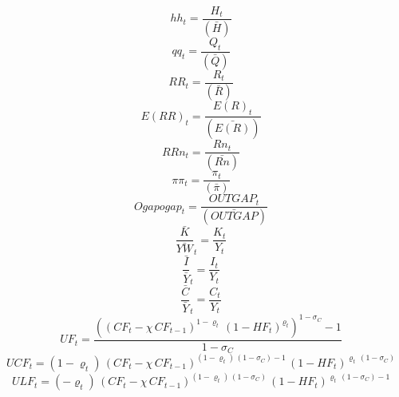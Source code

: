 \begin{dmath}
{hh}_{t}=\frac{{H}_{t}}{(\bar{H})}
\end{dmath}
\begin{dmath}
{qq}_{t}=\frac{{Q}_{t}}{(\bar{Q})}
\end{dmath}
\begin{dmath}
{RR}_{t}=\frac{{R}_{t}}{(\bar{R})}
\end{dmath}
\begin{dmath}
{E(RR)}_{t}=\frac{{E(R)}_{t}}{(\bar{E(R)})}
\end{dmath}
\begin{dmath}
{RRn}_{t}=\frac{{Rn}_{t}}{(\bar{Rn})}
\end{dmath}
\begin{dmath}
{\pi\pi}_{t}=\frac{{\pi}_{t}}{(\bar{\pi})}
\end{dmath}
\begin{dmath}
{Ogapogap}_{t}=\frac{{OUTGAP}_{t}}{(\bar{OUTGAP})}
\end{dmath}
\begin{dmath}
{\frac{\bar{K}}{\bar{YW}}}_{t}=\frac{{K}_{t}}{{Y}_{t}}
\end{dmath}
\begin{dmath}
{\frac{\bar{I}}{\bar{Y}}}_{t}=\frac{{I}_{t}}{{Y}_{t}}
\end{dmath}
\begin{dmath}
{\frac{\bar{C}}{\bar{Y}}}_{t}=\frac{{C}_{t}}{{Y}_{t}}
\end{dmath}
\begin{dmath}
{UF}_{t}=\frac{\left(\left({CF}_{t}-{{\chi}}\, {CF}_{t-1}\right)^{1-{{\varrho}}_{t}}\, \left(1-{HF}_{t}\right)^{{{\varrho}}_{t}}\right)^{1-{{\sigma_{C}}}}-1}{1-{{\sigma_{C}}}}
\end{dmath}
\begin{dmath}
{UCF}_{t}=\left(1-{{\varrho}}_{t}\right)\, \left({CF}_{t}-{{\chi}}\, {CF}_{t-1}\right)^{\left(1-{{\varrho}}_{t}\right)\, \left(1-{{\sigma_{C}}}\right)-1}\, \left(1-{HF}_{t}\right)^{{{\varrho}}_{t}\, \left(1-{{\sigma_{C}}}\right)}
\end{dmath}
\begin{dmath}
{ULF}_{t}=\left(-{{\varrho}}_{t}\right)\, \left({CF}_{t}-{{\chi}}\, {CF}_{t-1}\right)^{\left(1-{{\varrho}}_{t}\right)\, \left(1-{{\sigma_{C}}}\right)}\, \left(1-{HF}_{t}\right)^{{{\varrho}}_{t}\, \left(1-{{\sigma_{C}}}\right)-1}
\end{dmath}
